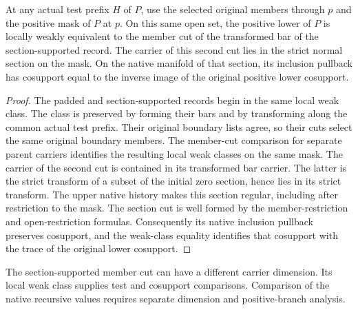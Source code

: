 \begin{theorem}
\label{hir:g1-positive-normal-member-section-class}
\leanok
At any actual test prefix $H$ of $P$, use the selected original
members through $p$ and the positive mask of $P$ at $p$.
On this same open set, the positive lower of $P$ is locally weakly
equivalent to the member cut of the transformed bar of the
section-supported record. The carrier of this second cut lies in
the strict normal section on the mask. On the native manifold of
that section, its inclusion pullback has cosupport equal to the
inverse image of the original positive lower cosupport.
\end{theorem}
\begin{proof}
The padded and section-supported records begin in the same local
weak class. The class is preserved by forming their bars and by
transforming along the common actual test prefix. Their original
boundary lists agree, so their cuts select the same original
boundary members. The member-cut comparison for separate parent
carriers identifies the resulting local weak classes on the same
mask. The carrier of the second cut is contained in its transformed
bar carrier. The latter is the strict transform of a subset of the
initial zero section, hence lies in its strict transform. The upper
native history makes this section regular, including after restriction
to the mask. The section cut is well formed by the member-restriction
and open-restriction formulas. Consequently its native inclusion
pullback preserves cosupport, and the weak-class equality identifies
that cosupport with the trace of the original lower cosupport.
\end{proof}

The section-supported member cut can have a different carrier dimension.
Its local weak class supplies test and cosupport comparisons. Comparison
of the native recursive values requires separate dimension and
positive-branch analysis.

